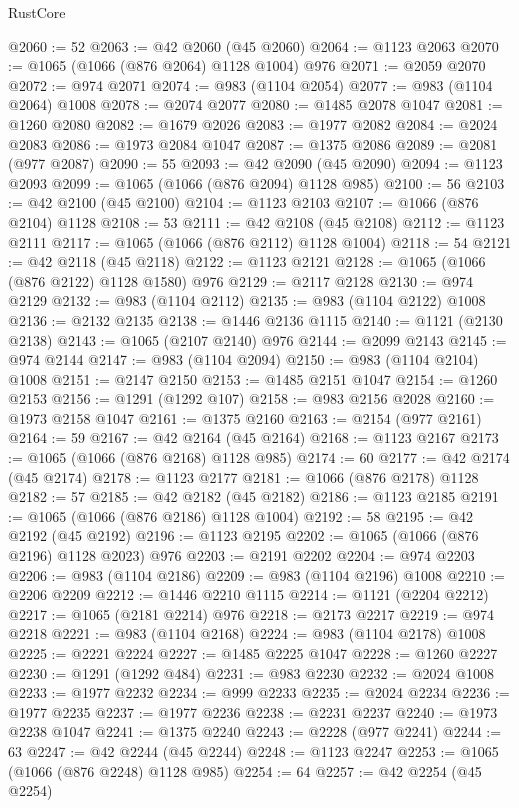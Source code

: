 \begin{lexlean}{RustCore}
\begin{coremodule}
@2060 := 52
@2063 := @42 @2060 (@45 @2060)
@2064 := @1123 @2063
@2070 := @1065 (@1066 (@876 @2064) @1128 @1004) @976
@2071 := @2059 @2070
@2072 := @974 @2071
@2074 := @983 (@1104 @2054)
@2077 := @983 (@1104 @2064) @1008
@2078 := @2074 @2077
@2080 := @1485 @2078 @1047
@2081 := @1260 @2080
@2082 := @1679 @2026
@2083 := @1977 @2082
@2084 := @2024 @2083
@2086 := @1973 @2084 @1047
@2087 := @1375 @2086
@2089 := @2081 (@977 @2087)
@2090 := 55
@2093 := @42 @2090 (@45 @2090)
@2094 := @1123 @2093
@2099 := @1065 (@1066 (@876 @2094) @1128 @985)
@2100 := 56
@2103 := @42 @2100 (@45 @2100)
@2104 := @1123 @2103
@2107 := @1066 (@876 @2104) @1128
@2108 := 53
@2111 := @42 @2108 (@45 @2108)
@2112 := @1123 @2111
@2117 := @1065 (@1066 (@876 @2112) @1128 @1004)
@2118 := 54
@2121 := @42 @2118 (@45 @2118)
@2122 := @1123 @2121
@2128 := @1065 (@1066 (@876 @2122) @1128 @1580) @976
@2129 := @2117 @2128
@2130 := @974 @2129
@2132 := @983 (@1104 @2112)
@2135 := @983 (@1104 @2122) @1008
@2136 := @2132 @2135
@2138 := @1446 @2136 @1115
@2140 := @1121 (@2130 @2138)
@2143 := @1065 (@2107 @2140) @976
@2144 := @2099 @2143
@2145 := @974 @2144
@2147 := @983 (@1104 @2094)
@2150 := @983 (@1104 @2104) @1008
@2151 := @2147 @2150
@2153 := @1485 @2151 @1047
@2154 := @1260 @2153
@2156 := @1291 (@1292 @107)
@2158 := @983 @2156 @2028
@2160 := @1973 @2158 @1047
@2161 := @1375 @2160
@2163 := @2154 (@977 @2161)
@2164 := 59
@2167 := @42 @2164 (@45 @2164)
@2168 := @1123 @2167
@2173 := @1065 (@1066 (@876 @2168) @1128 @985)
@2174 := 60
@2177 := @42 @2174 (@45 @2174)
@2178 := @1123 @2177
@2181 := @1066 (@876 @2178) @1128
@2182 := 57
@2185 := @42 @2182 (@45 @2182)
@2186 := @1123 @2185
@2191 := @1065 (@1066 (@876 @2186) @1128 @1004)
@2192 := 58
@2195 := @42 @2192 (@45 @2192)
@2196 := @1123 @2195
@2202 := @1065 (@1066 (@876 @2196) @1128 @2023) @976
@2203 := @2191 @2202
@2204 := @974 @2203
@2206 := @983 (@1104 @2186)
@2209 := @983 (@1104 @2196) @1008
@2210 := @2206 @2209
@2212 := @1446 @2210 @1115
@2214 := @1121 (@2204 @2212)
@2217 := @1065 (@2181 @2214) @976
@2218 := @2173 @2217
@2219 := @974 @2218
@2221 := @983 (@1104 @2168)
@2224 := @983 (@1104 @2178) @1008
@2225 := @2221 @2224
@2227 := @1485 @2225 @1047
@2228 := @1260 @2227
@2230 := @1291 (@1292 @484)
@2231 := @983 @2230
@2232 := @2024 @1008
@2233 := @1977 @2232
@2234 := @999 @2233
@2235 := @2024 @2234
@2236 := @1977 @2235
@2237 := @1977 @2236
@2238 := @2231 @2237
@2240 := @1973 @2238 @1047
@2241 := @1375 @2240
@2243 := @2228 (@977 @2241)
@2244 := 63
@2247 := @42 @2244 (@45 @2244)
@2248 := @1123 @2247
@2253 := @1065 (@1066 (@876 @2248) @1128 @985)
@2254 := 64
@2257 := @42 @2254 (@45 @2254)

\end{coremodule}
\end{lexlean}
